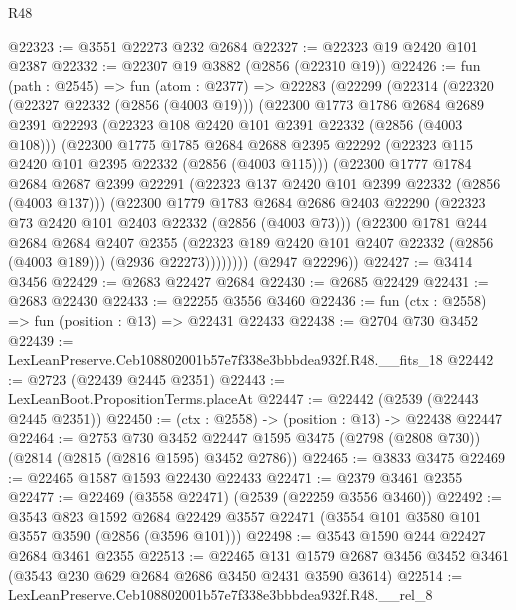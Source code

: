 \begin{lexlean}{R48}
\begin{coremodule}
@22323 := @3551 @22273 @232 @2684
@22327 := @22323 @19 @2420 @101 @2387
@22332 := @22307 @19 @3882 (@2856 (@22310 @19))
@22426 := fun (path : @2545) =>
  fun (atom : @2377) =>
  @22283
    (@22299
      (@22314
        (@22320
          (@22327 @22332 (@2856 (@4003 @19)))
          (@22300
            @1773
            @1786
            @2684
            @2689
            @2391
            @22293
            (@22323 @108 @2420 @101 @2391 @22332 (@2856 (@4003 @108)))
            (@22300
              @1775
              @1785
              @2684
              @2688
              @2395
              @22292
              (@22323 @115 @2420 @101 @2395 @22332 (@2856 (@4003 @115)))
              (@22300
                @1777
                @1784
                @2684
                @2687
                @2399
                @22291
                (@22323 @137 @2420 @101 @2399 @22332 (@2856 (@4003 @137)))
                (@22300
                  @1779
                  @1783
                  @2684
                  @2686
                  @2403
                  @22290
                  (@22323 @73 @2420 @101 @2403 @22332 (@2856 (@4003 @73)))
                  (@22300
                    @1781
                    @244
                    @2684
                    @2684
                    @2407
                    @2355
                    (@22323 @189 @2420 @101 @2407 @22332 (@2856 (@4003 @189)))
                    (@2936 @22273))))))))
      (@2947 @22296))
@22427 := @3414 @3456
@22429 := @2683 @22427 @2684
@22430 := @2685 @22429
@22431 := @2683 @22430
@22433 := @22255 @3556 @3460
@22436 := fun (ctx : @2558) => fun (position : @13) => @22431 @22433
@22438 := @2704 @730 @3452
@22439 := LexLeanPreserve.Ceb108802001b57e7f338e3bbbdea932f.R48.__fits_18
@22442 := @2723 (@22439 @2445 @2351)
@22443 := LexLeanBoot.PropositionTerms.placeAt
@22447 := @22442 (@2539 (@22443 @2445 @2351))
@22450 := (ctx : @2558) -> (position : @13) -> @22438 @22447
@22464 := @2753
    @730
    @3452
    @22447
    @1595
    @3475
    (@2798 (@2808 @730))
    (@2814 (@2815 (@2816 @1595) @3452 @2786))
@22465 := @3833 @3475
@22469 := @22465 @1587 @1593 @22430 @22433
@22471 := @2379 @3461 @2355
@22477 := @22469 (@3558 @22471) (@2539 (@22259 @3556 @3460))
@22492 := @3543
    @823
    @1592
    @2684
    @22429
    @3557
    @22471
    (@3554 @101 @3580 @101 @3557 @3590 (@2856 (@3596 @101)))
@22498 := @3543 @1590 @244 @22427 @2684 @3461 @2355
@22513 := @22465
    @131
    @1579
    @2687
    @3456
    @3452
    @3461
    (@3543 @230 @629 @2684 @2686 @3450 @2431 @3590 @3614)
@22514 := LexLeanPreserve.Ceb108802001b57e7f338e3bbbdea932f.R48.__rel_8

\end{coremodule}
\end{lexlean}
